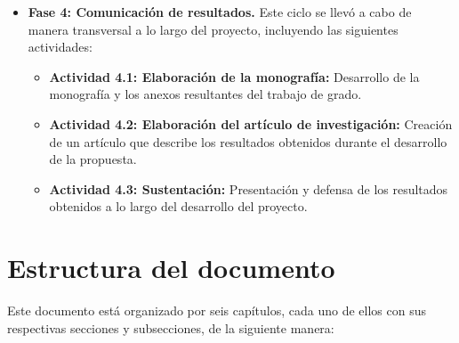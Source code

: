 \begin{itemize}
          \begin{itemize}
              \item \textbf{Actividad 3.1: Diseño del instrumento:} Se diseñó el instrumento de evaluación, incluyendo la definición de criterios, la escala de medición y la estructura de preguntas cerradas y abiertas.
              \item \textbf{Actividad 3.2: Selección del panel de expertos:} Se identificaron, contactaron y seleccionaron los profesionales con experiencia en metodologías ágiles y desarrollo de software que conformaron el panel evaluador.
              \item \textbf{Actividad 3.3: Recolección de datos:} Se ejecutó el proceso de validación con los expertos seleccionados y se recopilaron sus valoraciones cuantitativas y cualitativas.
              \item \textbf{Actividad 3.4: Análisis de concordancia y resultados:} Se procesaron los datos obtenidos mediante el cálculo del coeficiente de concordancia $\kappa_{\text{free}}$ de Randolph y se generó el informe de resultados con las oportunidades de mejora identificadas.
          \end{itemize}
    \item \textbf{Fase 4: Comunicación de resultados.} Este ciclo se llevó a cabo de manera transversal a lo largo del proyecto, incluyendo las siguientes actividades:
          \begin{itemize}
              \item \textbf{Actividad 4.1: Elaboración de la monografía:} Desarrollo de la monografía y los anexos resultantes del trabajo de grado.
              \item \textbf{Actividad 4.2: Elaboración del artículo de investigación:} Creación de un artículo que describe los resultados obtenidos durante el desarrollo de la propuesta.
              \item \textbf{Actividad 4.3: Sustentación:} Presentación y defensa de los resultados obtenidos a lo largo del desarrollo del proyecto.
          \end{itemize}
\end{itemize}

\section{Estructura del documento}
Este documento está organizado por seis capítulos, cada uno de ellos con sus respectivas secciones y subsecciones, de la siguiente manera:

